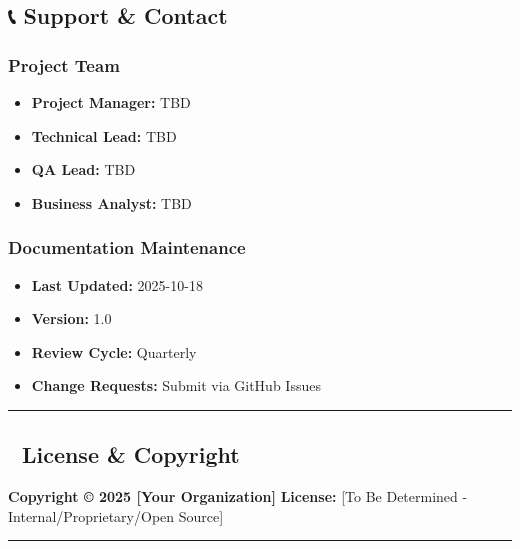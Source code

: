 \documentclass[
]{article}
\providecommand{\tightlist}{%
  \setlength{\itemsep}{0pt}\setlength{\parskip}{0pt}}
\begin{document}
\hypertarget{support-contact}{%
\subsection{📞 Support \& Contact}\label{support-contact}}

\hypertarget{project-team}{%
\subsubsection{Project Team}\label{project-team}}

\begin{itemize}
\tightlist
\item
  \textbf{Project Manager:} TBD
\item
  \textbf{Technical Lead:} TBD
\item
  \textbf{QA Lead:} TBD
\item
  \textbf{Business Analyst:} TBD
\end{itemize}

\hypertarget{documentation-maintenance}{%
\subsubsection{Documentation
Maintenance}\label{documentation-maintenance}}

\begin{itemize}
\tightlist
\item
  \textbf{Last Updated:} 2025-10-18
\item
  \textbf{Version:} 1.0
\item
  \textbf{Review Cycle:} Quarterly
\item
  \textbf{Change Requests:} Submit via GitHub Issues
\end{itemize}

\begin{center}\rule{0.5\linewidth}{0.5pt}\end{center}

\hypertarget{license-copyright}{%
\subsection{📄 License \& Copyright}\label{license-copyright}}

\textbf{Copyright © 2025 {[}Your Organization{]}} \textbf{License:}
{[}To Be Determined - Internal/Proprietary/Open Source{]}

\begin{center}\rule{0.5\linewidth}{0.5pt}\end{center}
\end{document}
